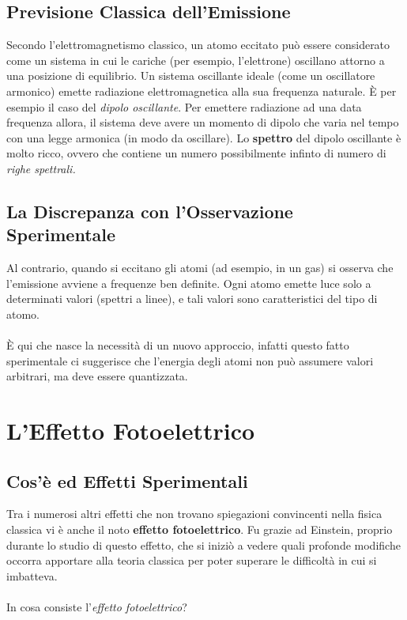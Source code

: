 \subsection{Previsione Classica dell'Emissione}

		Secondo l'elettromagnetismo classico, un atomo eccitato può essere considerato come un sistema in cui le cariche (per esempio, l'elettrone) oscillano attorno a una posizione di equilibrio. Un sistema oscillante ideale (come un oscillatore armonico) emette radiazione elettromagnetica alla sua frequenza naturale. È per esempio il caso del \textit{dipolo oscillante}. Per emettere radiazione ad una data frequenza allora, il sistema deve avere un momento di dipolo che varia nel tempo con una legge armonica (in modo da oscillare). Lo \textbf{spettro} del dipolo oscillante è molto ricco, ovvero che contiene un numero possibilmente infinto di numero di \textit{righe spettrali.}

\subsection{La Discrepanza con l'Osservazione Sperimentale}

		Al contrario, quando si eccitano gli atomi (ad esempio, in un gas) si osserva che l'emissione avviene a frequenze ben definite. Ogni atomo emette luce solo a determinati valori (spettri a linee), e tali valori sono caratteristici del tipo di atomo. 
	\\
	\\
	È qui che nasce la necessità di un nuovo approccio, infatti questo fatto sperimentale ci suggerisce che l'energia degli atomi non può assumere valori arbitrari, ma deve essere quantizzata.
	
\section{L'Effetto Fotoelettrico}

\subsection{Cos'è ed Effetti Sperimentali}
	
	Tra i numerosi altri effetti che non trovano spiegazioni convincenti nella fisica classica vi è anche il noto \textbf{effetto fotoelettrico}. Fu grazie ad Einstein, proprio durante lo studio di questo effetto, che si iniziò a vedere quali profonde modifiche occorra apportare alla teoria classica per poter superare le difficoltà in cui si imbatteva.
	\\
	\\
	In cosa consiste l'\textit{effetto fotoelettrico}?

